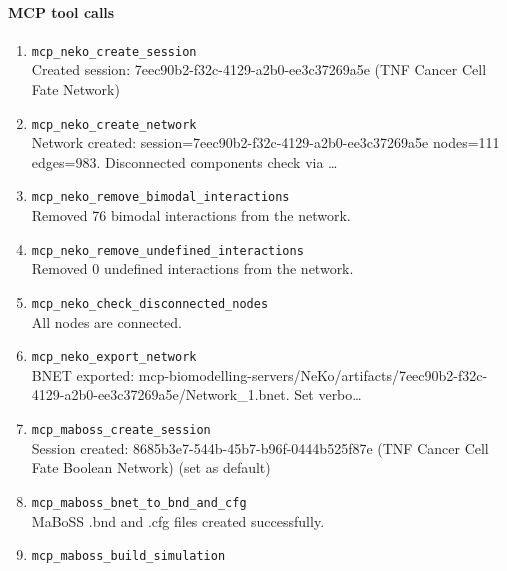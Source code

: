 \paragraph{MCP tool calls}
\begingroup
\small
\setlength{\itemsep}{5pt}
\setlength{\parskip}{0pt}
\begin{enumerate}
\item[1.] \texttt{mcp\_\allowbreak{}neko\_\allowbreak{}create\_\allowbreak{}session}
\hfill\\
\RaggedRight Created session: 7eec90b2-f32c-4129-a2b0-ee3c37269a5e (TNF Cancer Cell Fate Network)
\item[2.] \texttt{mcp\_\allowbreak{}neko\_\allowbreak{}create\_\allowbreak{}network}
\hfill\\
\RaggedRight Network created: session=7eec90b2-f32c-4129-a2b0-ee3c37269a5e nodes=111 edges=983. Disconnected components check via \ldots{}
\item[3.] \texttt{mcp\_\allowbreak{}neko\_\allowbreak{}remove\_\allowbreak{}bimodal\_\allowbreak{}interactions}
\hfill\\
\RaggedRight Removed 76 bimodal interactions from the network.
\item[4.] \texttt{mcp\_\allowbreak{}neko\_\allowbreak{}remove\_\allowbreak{}undefined\_\allowbreak{}interactions}
\hfill\\
\RaggedRight Removed 0 undefined interactions from the network.
\item[5.] \texttt{mcp\_\allowbreak{}neko\_\allowbreak{}check\_\allowbreak{}disconnected\_\allowbreak{}nodes}
\hfill\\
\RaggedRight All nodes are connected.
\item[6.] \texttt{mcp\_\allowbreak{}neko\_\allowbreak{}export\_\allowbreak{}network}
\hfill\\
\RaggedRight BNET exported: mcp-biomodelling-servers/NeKo/artifacts/7eec90b2-f32c-4129-a2b0-ee3c37269a5e/Network\_1.bnet. Set verbo\ldots{}
\item[7.] \texttt{mcp\_\allowbreak{}maboss\_\allowbreak{}create\_\allowbreak{}session}
\hfill\\
\RaggedRight Session created: 8685b3e7-544b-45b7-b96f-0444b525f87e (TNF Cancer Cell Fate Boolean Network) (set as default)
\item[8.] \texttt{mcp\_\allowbreak{}maboss\_\allowbreak{}bnet\_\allowbreak{}to\_\allowbreak{}bnd\_\allowbreak{}and\_\allowbreak{}cfg}
\hfill\\
\RaggedRight MaBoSS .bnd and .cfg files created successfully.
\item[9.] \texttt{mcp\_\allowbreak{}maboss\_\allowbreak{}build\_\allowbreak{}simulation}

\end{enumerate}
